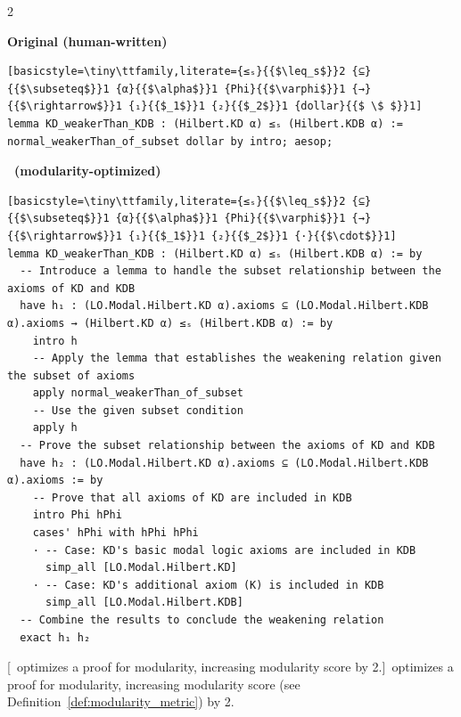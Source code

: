 {
\setlength{\columnsep}{0.2cm}
\begin{paracol}{2}
{
\textbf{Original (human-written)}
\begin{lstlisting}[basicstyle=\tiny\ttfamily,literate={≤ₛ}{{$\leq_s$}}2 {⊆}{{$\subseteq$}}1 {α}{{$\alpha$}}1 {Phi}{{$\varphi$}}1 {→}{{$\rightarrow$}}1 {₁}{{$_1$}}1 {₂}{{$_2$}}1 {dollar}{{$ \$ $}}1]
lemma KD_weakerThan_KDB : (Hilbert.KD α) ≤ₛ (Hilbert.KDB α) := normal_weakerThan_of_subset dollar by intro; aesop;

\end{lstlisting}
}
\switchcolumn
{
\textbf{\ImProver \ (modularity-optimized)}
\begin{lstlisting}[basicstyle=\tiny\ttfamily,literate={≤ₛ}{{$\leq_s$}}2 {⊆}{{$\subseteq$}}1 {α}{{$\alpha$}}1 {Phi}{{$\varphi$}}1 {→}{{$\rightarrow$}}1 {₁}{{$_1$}}1 {₂}{{$_2$}}1 {·}{{$\cdot$}}1]
lemma KD_weakerThan_KDB : (Hilbert.KD α) ≤ₛ (Hilbert.KDB α) := by
  -- Introduce a lemma to handle the subset relationship between the axioms of KD and KDB
  have h₁ : (LO.Modal.Hilbert.KD α).axioms ⊆ (LO.Modal.Hilbert.KDB α).axioms → (Hilbert.KD α) ≤ₛ (Hilbert.KDB α) := by
    intro h
    -- Apply the lemma that establishes the weakening relation given the subset of axioms
    apply normal_weakerThan_of_subset
    -- Use the given subset condition
    apply h
  -- Prove the subset relationship between the axioms of KD and KDB
  have h₂ : (LO.Modal.Hilbert.KD α).axioms ⊆ (LO.Modal.Hilbert.KDB α).axioms := by
    -- Prove that all axioms of KD are included in KDB
    intro Phi hPhi
    cases' hPhi with hPhi hPhi
    · -- Case: KD's basic modal logic axioms are included in KDB
      simp_all [LO.Modal.Hilbert.KD]
    · -- Case: KD's additional axiom (K) is included in KDB
      simp_all [LO.Modal.Hilbert.KDB]
  -- Combine the results to conclude the weakening relation
  exact h₁ h₂
\end{lstlisting}
}

\end{paracol}
[\ImProver \ optimizes a proof for modularity, increasing modularity score by 2.]{\ImProver \ optimizes a proof for modularity, increasing modularity score (see Definition~\ref{def:modularity_metric}) by 2.}
\label{fig:improver2-modularity-kd-kdb}
}





